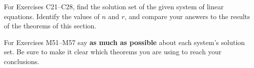 %
%
%
%
%
\begin{exercisegroup}
\begin{para}For Exercises C21--C28, find the solution set of the given system of linear equations. Identify the values of $n$ and $r$, and compare your answers to the results of the theorems of this section.\end{para}
\end{exercisegroup}
%
%
\begin{exercisegroup}
\begin{para}For Exercises M51--M57  say {\bf as much as possible} about each system's solution set.  Be sure to make it clear which theorems you are using to reach your conclusions.\end{para}
\end{exercisegroup}
%
%
